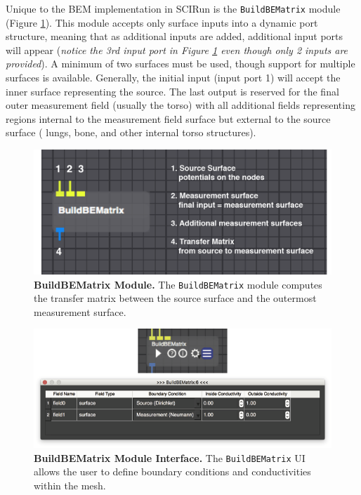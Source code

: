 Unique to the BEM implementation in SCIRun is the {\tt BuildBEMatrix} module (Figure \ref{fig:BuildBEModule}).
This module accepts only surface inputs into a dynamic port structure, meaning that as additional inputs are added, additional input ports will appear ({\em notice the 3rd input port in Figure \ref{fig:BuildBEModule} even though only 2 inputs are provided}).
A minimum of two surfaces must be used, though support for multiple surfaces is available.
Generally, the initial input (input port 1) will accept the inner surface representing the source.
The last output is reserved for the final outer measurement field (usually the torso) with all additional fields representing regions internal to the measurement field surface but external to the source surface (\eg{} lungs, bone, and other internal torso structures).

\begin{figure}[H]
\begin{center}
\includegraphics[width=.8\textwidth]{ECGToolkitGuide_figures/BEMmod.png}
\caption{{\bf BuildBEMatrix Module.} The {\tt BuildBEMatrix} module computes the transfer matrix between
the source surface and the outermost measurement surface.}
\label{fig:BuildBEModule}
\end{center}
\end{figure}

\newpage

\begin{figure}[t]
\begin{center}
\includegraphics[width=\textwidth]{ECGToolkitGuide_figures/BuildBEUI_combined.png}
\caption{{\bf BuildBEMatrix Module Interface.} The {\tt BuildBEMatrix} UI allows the user to define boundary
conditions and conductivities within the mesh. }
\label{fig:BEM_UI}
\end{center}
\end{figure}

